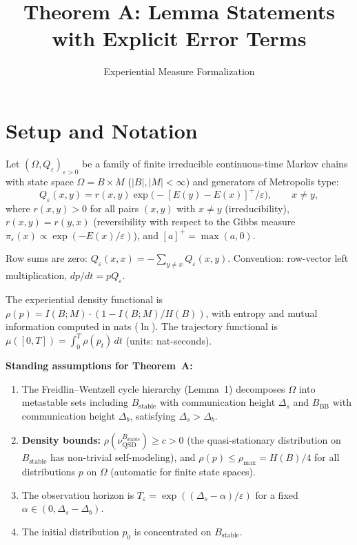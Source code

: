 \documentclass[11pt]{article}
\title{Theorem A: Lemma Statements with Explicit Error Terms}
\author{Experiential Measure Formalization}
\date{}
\newcommand{\eps}{\varepsilon}
\newcommand{\Ds}{\Delta_s}
\newcommand{\Db}{\Delta_b}
\newcommand{\Bstable}{B_{\mathrm{stable}}}
\newcommand{\BBB}{B_{\mathrm{BB}}}
\newcommand{\Teps}{T_\eps}
\newcommand{\QSD}{\mathrm{QSD}}
\begin{document}
\maketitle

\section{Setup and Notation}

Let $(\Omega, Q_\eps)_{\eps > 0}$ be a family of finite irreducible
continuous-time Markov chains with state space
$\Omega = B \times M$ ($|B|, |M| < \infty$) and generators of
Metropolis type:
\[
  Q_\eps(x,y) = r(x,y) \exp\!\bigl(-[E(y) - E(x)]^+ / \eps\bigr),
  \qquad x \neq y,
\]
where $r(x,y) > 0$ for all pairs $(x,y)$ with $x \neq y$ (irreducibility),
$r(x,y) = r(y,x)$ (reversibility with respect to the Gibbs measure
$\pi_\eps(x) \propto \exp(-E(x)/\eps)$), and $[a]^+ = \max(a, 0)$.

Row sums are zero: $Q_\eps(x,x) = -\sum_{y \neq x} Q_\eps(x,y)$.
Convention: row-vector left multiplication, $dp/dt = pQ_\eps$.

The experiential density functional is
$\rho(p) = I(B;M) \cdot (1 - I(B;M)/H(B))$,
with entropy and mutual information computed in nats ($\ln$).
The trajectory functional is
$\mu([0,T]) = \int_0^T \rho(p_t)\, dt$ (units: nat-seconds).

\medskip
\textbf{Standing assumptions for Theorem~A:}
\begin{enumerate}
\item The Freidlin--Wentzell cycle hierarchy (Lemma~1) decomposes
  $\Omega$ into metastable sets including $\Bstable$ with
  communication height $\Ds$ and $\BBB$ with communication height
  $\Db$, satisfying $\Ds > \Db$.
\item \textbf{Density bounds:} $\rho(\nu_\QSD^{\Bstable}) \geq c > 0$
  (the quasi-stationary distribution on $\Bstable$ has non-trivial
  self-modeling), and $\rho(p) \leq \rho_{\max} = H(B)/4$ for all
  distributions $p$ on $\Omega$ (automatic for finite state spaces).
\item The observation horizon is
  $\Teps = \exp((\Ds - \alpha)/\eps)$ for a fixed
  $\alpha \in (0, \Ds - \Db)$.
\item The initial distribution $p_0$ is concentrated on $\Bstable$.
\end{enumerate}
\end{document}
